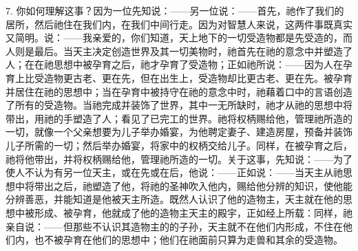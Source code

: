 7. 你如何理解这事？因为一位先知说：——另一位说：——首先，祂作了我们的居所，然后祂住在我们内，在我们中间行走。因为对智慧人来说，这两件事既真实又简明。说：——我亲爱的，你们知道，天上地下的一切受造物都是先受造的，而人则是最后。当天主决定创造世界及其一切美物时，祂首先在祂的意念中并塑造了人；在在祂思想中被孕育之后，祂才孕育了受造物；正如祂所说：——因为人在孕育上比受造物更古老、更在先，但在出生上，受造物却比更古老、更在先。被孕育并居住在祂的思想中；当在孕育中被持守在祂的意念中时，祂藉着口中的言语创造了所有的受造物。当祂完成并装饰了世界，其中一无所缺时，祂才从祂的思想中将带出，用祂的手塑造了人；看见了已完工的世界。祂将权柄赐给他，管理祂所造的一切，就像一个父亲想要为儿子举办婚宴，为他聘定妻子、建造房屋，预备并装饰儿子所需的一切；然后举办婚宴，将家中的权柄交给儿子。同样，在被孕育之后，祂将他带出，并将权柄赐给他，管理祂所造的一切。关于这事，先知说：——为了使人不认为有另一位天主，或在先或在后，他说：——正如说：——当天主从祂思想中将带出之后，祂塑造了他，将祂的圣神吹入他内，赐给他分辨的知识，使他能分辨善恶，并能知道是他被天主所造。既然人认识了他的造物主，天主就在他的思想中被形成、被孕育，他就成了他的造物主天主的殿宇，正如经上所载：同样，祂亲自说：——但那些不认识其造物主的的子孙，天主就不在他们内形成，不住在他们内，也不被孕育在他们的思想中；他们在祂面前只算为走兽和其余的受造物。\par

